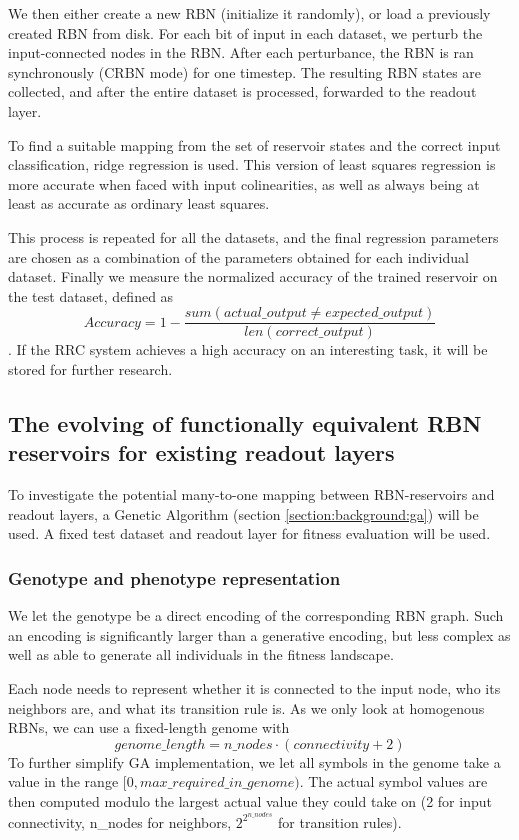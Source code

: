 We then either create a new RBN (initialize it randomly),
or load a previously created RBN from disk.
For each bit of input in each dataset,
we perturb the input-connected nodes in the RBN.
After each perturbance, the RBN is ran synchronously (CRBN mode) for one timestep.
The resulting RBN states are collected,
and after the entire dataset is processed,
forwarded to the readout layer.

To find a suitable mapping from the set of reservoir states and the correct input classification,
ridge regression \cite{hoerl1970ridge} is used.
This version of least squares regression is more accurate when faced with input colinearities,
as well as always being at least as accurate as ordinary least squares.

This process is repeated for all the datasets,
and the final regression parameters are chosen as a combination of the parameters obtained for each individual dataset.
Finally we measure the normalized accuracy of the trained reservoir on the test dataset,
defined as
\begin{equation}
Accuracy = 1 - \dfrac{sum(actual\_output \neq expected\_output)}{len(correct\_output)}
\label{formula:accuracy}
\end{equation}
.
If the RRC system achieves a high accuracy on an interesting task,
it will be stored for further research.

\subsection{The evolving of functionally equivalent RBN reservoirs for existing readout layers}
\label{section:method:evolving-rbns}

To investigate the potential many-to-one mapping between RBN-reservoirs and readout layers,
a Genetic Algorithm (section \ref{section:background:ga}) will be used.
A fixed test dataset and readout layer for fitness evaluation will be used.

\subsubsection{Genotype and phenotype representation}

We let the genotype be a direct encoding of the corresponding RBN graph.
Such an encoding is significantly larger than a generative encoding,
but less complex as well as able to generate all individuals in the fitness landscape.

Each node needs to represent whether it is connected to the input node,
who its neighbors are, and what its transition rule is.
As we only look at homogenous RBNs,
we can use a fixed-length genome with
\begin{equation}
genome\_length = n\_nodes \cdot (connectivity + 2)
\end{equation}
To further simplify GA implementation,
we let all symbols in the genome take a value in the range $[0, max\_required\_in\_genome)$.
The actual symbol values are then computed modulo the largest actual value they could take on
(2 for input connectivity, n\_nodes for neighbors, $2^{2^{n\_nodes}}$ for transition rules).

